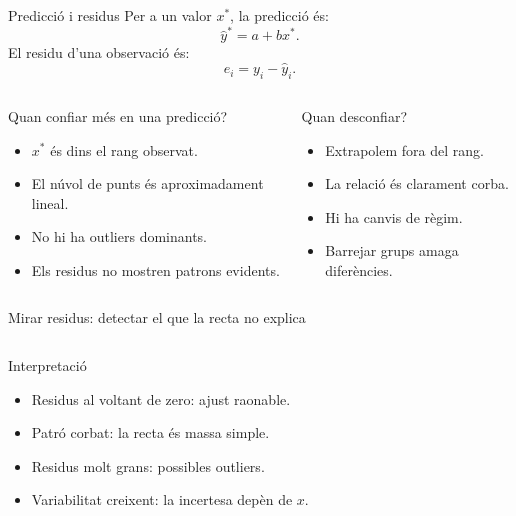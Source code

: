\documentclass[10pt,aspectratio=169]{beamer}
\begin{document}
\begin{frame}{Predicció i residus}
Per a un valor $x^*$, la predicció és:
\[
 \widehat{y}^*=a+bx^*.
\]
El residu d'una observació és:
\[
 e_i=y_i-\widehat{y}_i.
\]
\vspace{0.15cm}
\begin{columns}[T]
\begin{block}{Quan confiar més en una predicció?}
\begin{itemize}
  \item $x^*$ és dins el rang observat.
  \item El núvol de punts és aproximadament lineal.
  \item No hi ha outliers dominants.
  \item Els residus no mostren patrons evidents.
\end{itemize}
\end{block}
\begin{alertblock}{Quan desconfiar?}
\begin{itemize}
  \item Extrapolem fora del rang.
  \item La relació és clarament corba.
  \item Hi ha canvis de règim.
  \item Barrejar grups amaga diferències.
\end{itemize}
\end{alertblock}
\end{columns}
\end{frame}

\begin{frame}{Mirar residus: detectar el que la recta no explica}
\begin{columns}[T]
\centering
{}
\begin{block}{Interpretació}
\begin{itemize}
  \item Residus al voltant de zero: ajust raonable.
  \item Patró corbat: la recta és massa simple.
  \item Residus molt grans: possibles outliers.
  \item Variabilitat creixent: la incertesa depèn de $x$.
\end{itemize}
\end{block}
\end{columns}
\end{frame}
\end{document}
